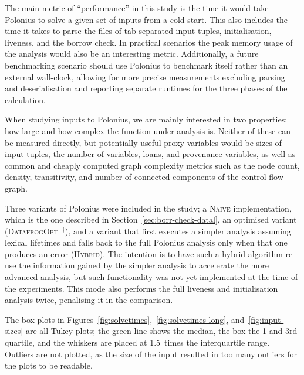 \documentclass[11pt,a4paper,twoside,openany]{report}
\newcommand{\notmine}[0] {$^\dagger$}
\begin{document}
{The main metric of ``performance'' in this study is the time it would take
Polonius to solve a given set of inputs from a cold start. This also includes
the time it takes to parse the files of tab-separated input tuples,
initialisation, liveness, and the borrow check. In practical scenarios the peak
memory usage of the analysis would also be an interesting metric. Additionally,
a future benchmarking scenario should use Polonius to benchmark itself rather
than an external wall-clock, allowing for more precise measurements excluding
parsing and deserialisation and reporting separate runtimes for the three
phases of the calculation.

When studying inputs to Polonius, we are mainly interested in two properties;
how large and how complex the function under analysis is. Neither of these can
be measured directly, but potentially useful proxy variables would be sizes of
input tuples, the number of variables, loans, and provenance variables, as well
as common and cheaply computed graph complexity metrics such as the node count,
density, transitivity, and number of connected components of the control-flow
graph.

Three variants of Polonius were included in the study; a \textsc{Naive}
implementation, which is the one described in
Section~\ref{sec:borr-check-datal}, an optimised variant
(\textsc{DatafrogOpt}~\notmine{}), and a variant that first executes a simpler
analysis assuming lexical lifetimes and falls back to the full Polonius analysis
only when that one produces an error (\textsc{Hybrid}). The intention is to have
such a hybrid algorithm re-use the information gained by the simpler analysis to
accelerate the more advanced analysis, but such functionality was not yet
implemented at the time of the experiments. This mode also performs the full
liveness and initialisation analysis twice, penalising it in the
comparison.

The box plots in Figures~\ref{fig:solvetimes},~\ref{fig:solvetimes-long},
and~\ref{fig:input-sizes} are all Tukey plots; the green line shows the median,
the box the 1 and 3rd quartile, and the whiskers are placed at 1.5~times the
interquartile range. Outliers are not plotted, as the size of the input resulted
in too many outliers for the plots to be readable.

}
\end{document}

